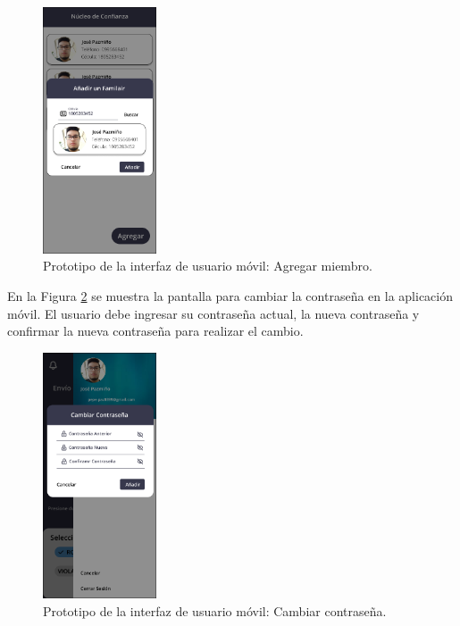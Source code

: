 \begin{figure}[H]
    \centering
    \includegraphics[width=0.3\textwidth]{chapters/III-resultados-y-discusion/resources/images/prototipo-agregar-miembro-mobile.png}
    \caption{Prototipo de la interfaz de usuario móvil: Agregar miembro.}
    \label{fig:prototipo-agregar-miembro-mobile}
\end{figure}

En la Figura \ref{fig:prototipo-cambiar-contrasena-mobile} se muestra la pantalla para cambiar la contraseña en la aplicación móvil. El usuario
debe ingresar su contraseña actual, la nueva contraseña y confirmar la nueva contraseña para realizar el cambio.

\begin{figure}[H]
    \centering
    \includegraphics[width=0.3\textwidth]{chapters/III-resultados-y-discusion/resources/images/prototipo-cambiar-contrasena-mobile.png}
    \caption{Prototipo de la interfaz de usuario móvil: Cambiar contraseña.}
    \label{fig:prototipo-cambiar-contrasena-mobile}
\end{figure}

